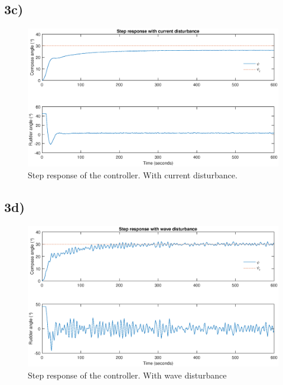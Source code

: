 \subsection{3c)}


\begin{figure}
    \centering
    \includegraphics[width=\textwidth]{images/oppg3/stepresp_current_disturbance.eps}
    \caption{Step response of the controller. With current disturbance.}
    \label{fig:step_current_dist}
\end{figure}

\subsection{3d)}


\begin{figure}
    \centering
    \includegraphics[width=\textwidth]{images/oppg3/stepresp_wave_disturbance.eps}
    \caption{Step response of the controller. With wave disturbance}
    \label{fig:step_wave_dist}
\end{figure}
